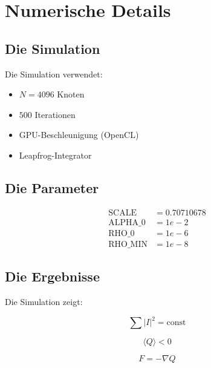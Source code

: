 
\section{Numerische Details}

\subsection{Die Simulation}

Die Simulation verwendet:

\begin{itemize}
    \item \( N = 4096 \) Knoten
    \item \( 500 \) Iterationen
    \item GPU-Beschleunigung (OpenCL)
    \item Leapfrog-Integrator
\end{itemize}

\subsection{Die Parameter}

\begin{align*}
    \text{SCALE} &= 0.70710678 \\
    \text{ALPHA\_0} &= 1e-2 \\
    \text{RHO\_0} &= 1e-6 \\
    \text{RHO\_MIN} &= 1e-8
\end{align*}

\subsection{Die Ergebnisse}

Die Simulation zeigt:

\[
\sum |I|^2 = \text{const}
\]

\[
\langle Q \rangle < 0
\]

\[
F = -\nabla Q
\]
